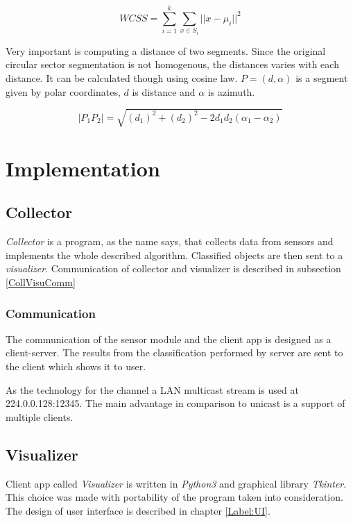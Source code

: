 \begin{equation}
\mathit{WCSS} = \sum_{i=1}^{k} \sum_{x \in S_i} ||x - \mu_i||^2
\end{equation}

Very important is computing a distance of two segments. Since the original circular sector segmentation
is not homogenous, the distances varies with each distance. It can be calculated though using
cosine law. $P = (d, \alpha)$ is a segment given by polar coordinates, $d$ is distance and $\alpha$ is
azimuth.

\begin{equation}
|P_{1} P_{2}| = \sqrt{(d_{1})^{2} + (d_{2})^{2} - 2d_{1}d_{2}(\alpha_1 - \alpha_2)}
\end{equation}




\chapter{Implementation}

\section{Collector}
{\it Collector} is a program, as the name says, that collects data from sensors and implements
the whole described algorithm. Classified objects are then sent to a {\it visualizer}.
Communication of collector and visualizer is described in subsection \ref{CollVisuComm}

\subsection*{Communication}
\label{CollVisuComm}
The communication of the sensor module and the client app is designed as a client-server. The results
from the classification performed by server are sent to the client which shows it to user.

As the technology for the channel a LAN multicast stream is used at 224.0.0.128:12345.
The main advantage in comparison to unicast is a support of multiple clients.

\section{Visualizer}
Client app called {\it Visualizer} is written in {\it Python3} and graphical library {\it Tkinter}.
This choice was made with portability of the program taken into consideration.
The design of user interface is described in chapter \ref{Label:UI}.






